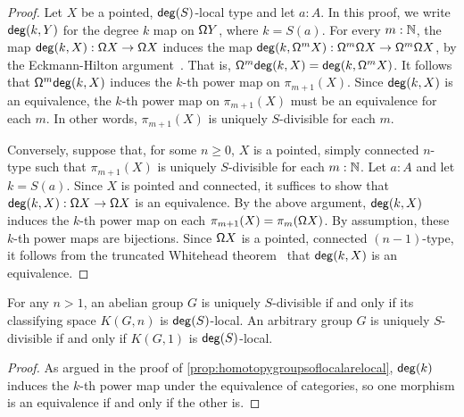 \begin{proof}
    Let $X$ be a pointed, $\mathsf{deg}(S)$-local type and let $a : A$.
    In this proof, we write $\mathsf{deg}(k, Y)$ for the degree $k$ map on $\mathsf{\Omega} Y$,
    where $k = S(a)$.
    For every $m : \mathbb{N}$,
    the map $\mathsf{deg}(k, X) : \mathsf{\Omega} X \to \mathsf{\Omega} X$ induces
    the map $\mathsf{deg}(k, \mathsf{\Omega}^m X) : \mathsf{\Omega}^m \mathsf{\Omega} X \to \mathsf{\Omega}^m \mathsf{\Omega} X$,
    by the Eckmann-Hilton argument~\cite[Theorem~2.1.6]{hottbook}.
    That is, $\mathsf{\Omega}^m \mathsf{deg}(k, X) = \mathsf{deg}(k, \mathsf{\Omega}^m X)$.
    It follows that $\mathsf{\Omega}^m \mathsf{deg}(k, X)$ induces the $k$-th power map on $\pi_{m+1}( X )$.
    Since $\mathsf{deg}(k, X)$ is an equivalence, the $k$-th power map on $\pi_{m+1}( X )$
    must be an equivalence for each $m$.
    In other words, $\pi_{m+1}( X )$ is uniquely $S$-divisible for each $m$.

    Conversely, suppose that, for some $n \geq 0$, $X$ is a pointed,
    simply connected $n$-type such that $\pi_{m+1}(X)$ is uniquely $S$-divisible
    for each $m : \mathbb{N}$.
    Let $a : A$ and let $k = S(a)$.
    Since $X$ is pointed and connected, it suffices to show that
    $\mathsf{deg}(k, X) : \mathsf{\Omega} X \to \mathsf{\Omega} X$ is an equivalence.
    By the above argument, $\mathsf{deg}(k, X)$ induces the $k$-th power map on each
    $\pi_{m+1}(X) = \pi_m(\mathsf{\Omega} X)$.
    By assumption, these $k$-th power maps are bijections.
    Since $\mathsf{\Omega} X$ is a pointed, connected $(n-1)$-type, it follows from the
    truncated Whitehead theorem~\cite[Theorem~8.8.3]{hottbook} that 
    $\mathsf{deg}(k, X)$ is an equivalence.
\end{proof}

\begin{cor}\label{corollary:characterizationpdivisible}
    For any $n > 1$, an abelian group $G$ is uniquely $S$-divisible if and only if its classifying space $K(G,n)$
    is $\mathsf{deg}(S)$-local. An arbitrary group $G$ is uniquely $S$-divisible if and only if $K(G,1)$ is $\mathsf{deg}(S)$-local.
\end{cor}

\begin{proof}
    As argued in the proof of \cref{prop:homotopygroupsoflocalarelocal}, $\mathsf{deg}(k)$ induces the $k$-th power map under the equivalence of categories, so one morphism is an equivalence if and only if the other is.
\end{proof}

